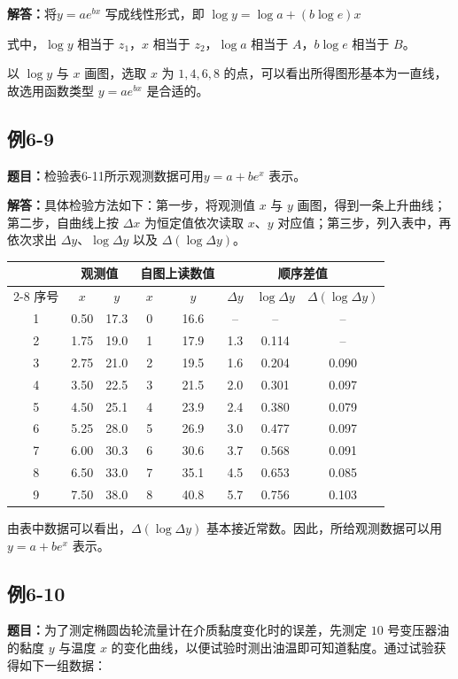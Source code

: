 \documentclass[UTF8,zihao=-4]{ctexart}
\newcommand{\problem}[1]{\subsection*{#1}}
\newcommand{\timu}{\noindent\textbf{题目：}}
\newcommand{\jieda}{\noindent\textbf{解答：}}
\begin{document}
\jieda 将$y=ae^{bx}$ 写成线性形式，即 $\log y=\log a+(b\log e)x$

式中，$\log y$ 相当于 $z_1$，$x$ 相当于 $z_2$，$\log a$ 相当于 $A$，$b\log e$ 相当于 $B$。

以 $\log y$ 与 $x$ 画图，选取 $x$ 为 $1,4,6,8$ 的点，可以看出所得图形基本为一直线，故选用函数类型 $y=ae^{bx}$ 是合适的。

\problem{例6-9}

\timu 检验表6-11所示观测数据可用$y=a+be^x$ 表示。

\jieda 具体检验方法如下：第一步，将观测值 $x$ 与 $y$ 画图，得到一条上升曲线；第二步，自曲线上按 $\Delta x$ 为恒定值依次读取 $x$、$y$ 对应值；第三步，列入表中，再依次求出 $\Delta y$、$\log\Delta y$ 以及 $\Delta(\log\Delta y)$。

\begin{center}
\scriptsize
\setlength{\tabcolsep}{5pt}
\begin{tabular}{c|cc|cc|ccc}
\toprule
 & \multicolumn{2}{c|}{观测值} & \multicolumn{2}{c|}{自图上读数值} & \multicolumn{3}{c}{顺序差值}\\
\cline{2-8}
序号 & $x$ & $y$ & $x$ & $y$ & $\Delta y$ & $\log\Delta y$ & $\Delta(\log\Delta y)$\\
\midrule
1 & 0.50 & 17.3 & 0 & 16.6 & --  & --    & --\\
2 & 1.75 & 19.0 & 1 & 17.9 & 1.3 & 0.114 & --\\
3 & 2.75 & 21.0 & 2 & 19.5 & 1.6 & 0.204 & 0.090\\
4 & 3.50 & 22.5 & 3 & 21.5 & 2.0 & 0.301 & 0.097\\
5 & 4.50 & 25.1 & 4 & 23.9 & 2.4 & 0.380 & 0.079\\
6 & 5.25 & 28.0 & 5 & 26.9 & 3.0 & 0.477 & 0.097\\
7 & 6.00 & 30.3 & 6 & 30.6 & 3.7 & 0.568 & 0.091\\
8 & 6.50 & 33.0 & 7 & 35.1 & 4.5 & 0.653 & 0.085\\
9 & 7.50 & 38.0 & 8 & 40.8 & 5.7 & 0.756 & 0.103\\
\bottomrule
\end{tabular}
\end{center}

由表中数据可以看出，$\Delta(\log\Delta y)$ 基本接近常数。因此，所给观测数据可以用 $y=a+be^x$ 表示。

\newpage

\problem{例6-10}

\timu 为了测定椭圆齿轮流量计在介质黏度变化时的误差，先测定 $10$ 号变压器油的黏度 $y$ 与温度 $x$ 的变化曲线，以便试验时测出油温即可知道黏度。通过试验获得如下一组数据：
\end{document}
